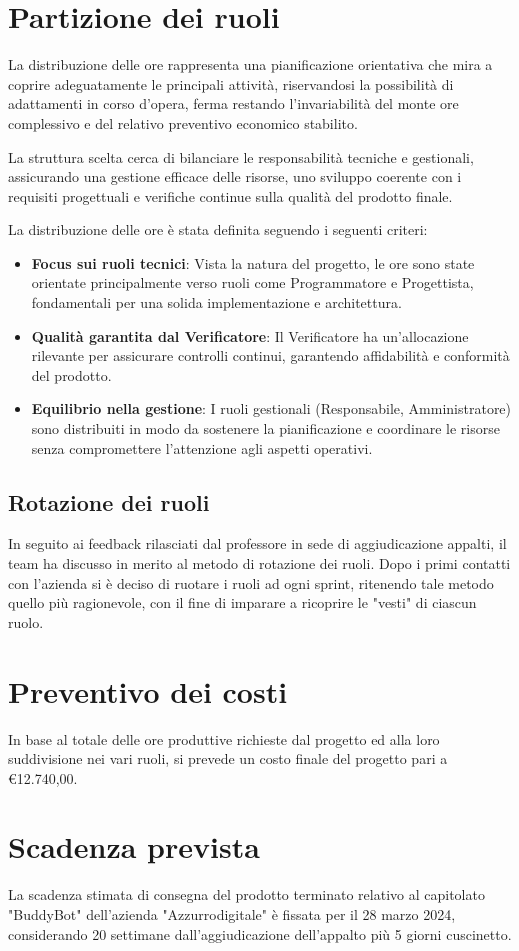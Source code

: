 \documentclass[italian, 12pt]{article}
\begin{document}
\section{Partizione dei ruoli}
La distribuzione delle ore rappresenta una pianificazione orientativa che mira a coprire adeguatamente le principali attività, riservandosi la possibilità di adattamenti in corso d’opera, ferma restando l'invariabilità del monte ore complessivo e del relativo preventivo economico stabilito.

La struttura scelta cerca di bilanciare le responsabilità tecniche e gestionali, assicurando una gestione efficace delle risorse, uno sviluppo coerente con i requisiti progettuali e verifiche continue sulla qualità del prodotto finale. 

La distribuzione delle ore è stata definita seguendo i seguenti criteri:
\begin{itemize}
    \item \textbf{Focus sui ruoli tecnici}: Vista la natura del progetto, le ore sono state orientate principalmente verso ruoli come Programmatore e Progettista, fondamentali per una solida implementazione e architettura.
    \item \textbf{Qualità garantita dal Verificatore}: Il Verificatore ha un’allocazione rilevante per assicurare controlli continui, garantendo affidabilità e conformità del prodotto.
    \item \textbf{Equilibrio nella gestione}: I ruoli gestionali (Responsabile, Amministratore) sono distribuiti in modo da sostenere la pianificazione e coordinare le risorse senza compromettere l’attenzione agli aspetti operativi.
\end{itemize}
\subsection{Rotazione dei ruoli}
In seguito ai feedback rilasciati dal professore in sede di aggiudicazione appalti, il team ha discusso in merito al metodo di rotazione dei ruoli. Dopo i primi contatti con l'azienda si è deciso di ruotare i ruoli ad ogni sprint, ritenendo tale metodo quello più ragionevole, con il fine di imparare a ricoprire le "vesti" di ciascun ruolo.


\section{Preventivo dei costi}
In base al totale delle ore produttive richieste dal progetto ed alla loro suddivisione nei vari ruoli, si prevede un costo finale del progetto pari a €12.740,00.

\section{Scadenza prevista}
La scadenza stimata di consegna del prodotto terminato relativo al capitolato "BuddyBot" dell'azienda "Azzurrodigitale" è fissata per il 28 marzo 2024, considerando 20 settimane dall'aggiudicazione dell'appalto più 5 giorni cuscinetto.
\end{document}
